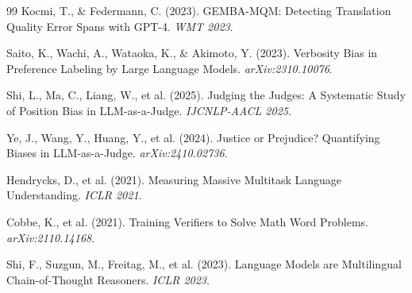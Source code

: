 \documentclass[11pt,a4paper,oneside]{article}
\begin{document}
\begin{thebibliography}{99}
 Kocmi, T., \& Federmann, C. (2023). GEMBA-MQM: Detecting Translation Quality Error Spans with GPT-4. \textit{WMT 2023}.

 Saito, K., Wachi, A., Wataoka, K., \& Akimoto, Y. (2023). Verbosity Bias in Preference Labeling by Large Language Models. \textit{arXiv:2310.10076}.

 Shi, L., Ma, C., Liang, W., et al. (2025). Judging the Judges: A Systematic Study of Position Bias in LLM-as-a-Judge. \textit{IJCNLP-AACL 2025}.

 Ye, J., Wang, Y., Huang, Y., et al. (2024). Justice or Prejudice? Quantifying Biases in LLM-as-a-Judge. \textit{arXiv:2410.02736}.

 Hendrycks, D., et al. (2021). Measuring Massive Multitask Language Understanding. \textit{ICLR 2021}.

 Cobbe, K., et al. (2021). Training Verifiers to Solve Math Word Problems. \textit{arXiv:2110.14168}.

 Shi, F., Suzgun, M., Freitag, M., et al. (2023). Language Models are Multilingual Chain-of-Thought Reasoners. \textit{ICLR 2023}.

\end{thebibliography}
\end{document}
